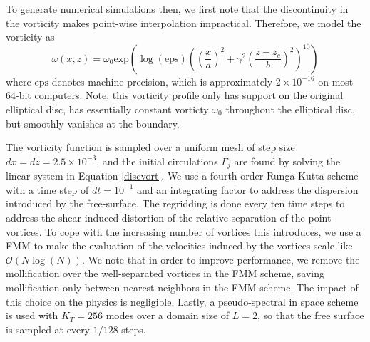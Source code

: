 \documentclass[a4paper,11pt]{article}
\begin{document}
To generate numerical simulations then, we first note that the discontinuity in the vorticity makes point-wise interpolation impractical.  Therefore, we model the vorticity as 
\[
\omega(x,z) = \omega_{0}\mbox{exp}\left(\log(\mbox{eps}) \left(\left(\frac{x}{a}\right)^{2} + \gamma^{2}\left(\frac{z-z_{c}}{b} \right)^{2}\right)^{10}\right)
\]
where $\mbox{eps}$ denotes machine precision, which is approximately $2\times 10^{-16}$ on most 64-bit computers.  Note, this vorticity profile only has support on the original elliptical disc, has essentially constant vorticty $\omega_{0}$ throughout the elliptical disc, but smoothly vanishes at the boundary.  

The vorticity function is sampled over a uniform mesh of step size $dx = dz = 2.5 \times 10^{-3}$, and the initial circulations $\Gamma_{j}$ are found by solving the linear system in Equation \eqref{discvort}.  We use a fourth order Runga-Kutta scheme with a time step of $dt = 10^{-1}$ and an integrating factor to address the dispersion introduced by the free-surface.  The regridding is done every ten time steps to address the shear-induced distortion of the relative separation of the point-vortices.  To cope with the increasing number of vortices this introduces, we use a FMM to make the evaluation of the velocities induced by the vortices scale like $\mathcal{O}(N\log(N))$.  We note that in order to improve performance, we remove the mollification over the well-separated vortices in the FMM scheme, saving mollification only between nearest-neighbors in the FMM scheme.  The impact of this choice on the physics is negligible.  Lastly, a pseudo-spectral in space scheme is used with $K_{T}=256$ modes over a domain size of $L=2$, so that the free surface is sampled at every $1/128$ steps.   
\end{document}
